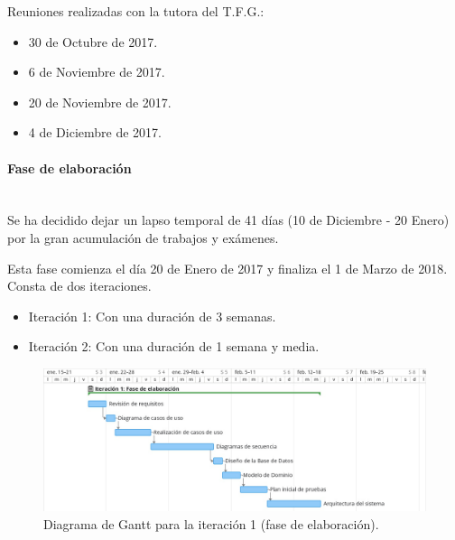 \documentclass[twoside]{report}
\begin{document}
Reuniones realizadas con la tutora del T.F.G.:

\begin{itemize}
\item 30 de Octubre de 2017.
\item 6 de Noviembre de 2017.
\item 20 de Noviembre de 2017.
\item 4 de Diciembre de 2017.
\end{itemize}

\paragraph{Fase de elaboración}\mbox{}\\

Se ha decidido dejar un lapso temporal de 41 días (10 de Diciembre - 20 Enero) por la gran acumulación de trabajos y exámenes.

Esta fase comienza el día 20 de Enero de 2017 y finaliza el 1 de Marzo de 2018. Consta de dos iteraciones.

\begin{itemize}
\item Iteración 1: Con una duración de 3 semanas.
\item Iteración 2: Con una duración de 1 semana y media.
\end{itemize}

\begin{figure}[h]
\begin{center}
\includegraphics[width=\textwidth]{images/gantt/ite1}
\caption{Diagrama de Gantt para la iteración 1 (fase de elaboración).}
\end{center}
\end{figure}
\end{document}
